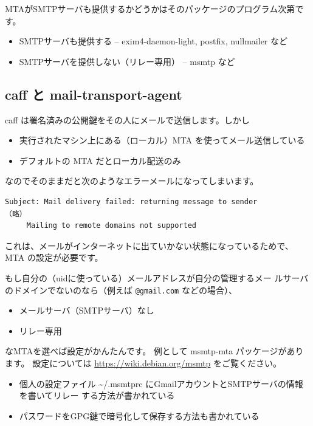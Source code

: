 \documentclass[mingoth,a4paper]{jsarticle}
\begin{document}
MTAがSMTPサーバも提供するかどうかはそのパッケージのプログラム次第です。

 \begin{itemize}
  \item SMTPサーバも提供する -- exim4-daemon-light, postfix, nullmailer
	など
  \item SMTPサーバを提供しない（リレー専用） -- msmtp など
 \end{itemize}


\subsection{caff と mail-transport-agent}
caff は署名済みの公開鍵をその人にメールで送信します。しかし 

 \begin{itemize}
  \item 実行されたマシン上にある（ローカル）MTA を使ってメール送信している
  \item デフォルトの MTA だとローカル配送のみ
 \end{itemize}
なのでそのままだと次のようなエラーメールになってしまいます。
\begin{verbatim}
Subject: Mail delivery failed: returning message to sender
（略）
	 Mailing to remote domains not supported
\end{verbatim}

	これは、メールがインターネットに出ていかない状態になっているためで、MTA
	の設定が必要です。

        もし自分の（uidに使っている）メールアドレスが自分の管理するメー
       ルサーバのドメインでないのなら（例えば \verb|@gmail.com| などの場合）、

 \begin{itemize}
  \item メールサーバ（SMTPサーバ）なし
  \item リレー専用
 \end{itemize}

       なMTAを選べば設定がかんたんです。
       例として msmtp-mta パッケージがあります。
設定については \url{https://wiki.debian.org/msmtp} をご覧ください。

 \begin{itemize}
  \item  個人の設定ファイル \textasciitilde/.msmtprc にGmailアカウントとSMTPサーバの情報を書いてリレー
 する方法が書かれている
  \item  パスワードをGPG鍵で暗号化して保存する方法も書かれている
 \end{itemize}
\end{document}

